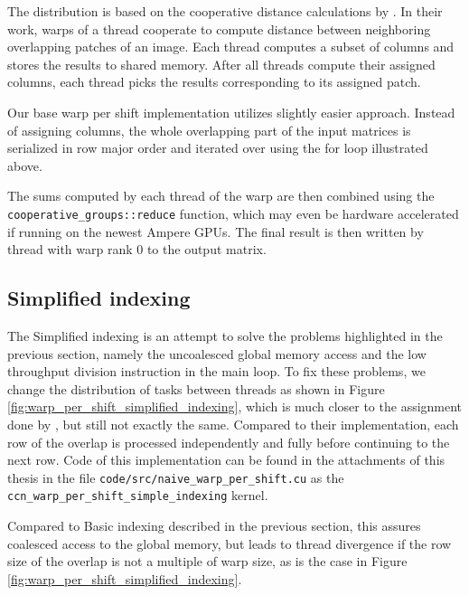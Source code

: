 The distribution is based on the cooperative distance calculations by \citet{paper:krulis_3d_block}. In their work, warps of a thread cooperate to compute distance between neighboring overlapping patches of an image. Each thread computes a subset of columns and stores the results to shared memory. After all threads compute their assigned columns, each thread picks the results corresponding to its assigned patch. 

Our base warp per shift implementation utilizes slightly easier approach. Instead of assigning columns, the whole overlapping part of the input matrices is serialized in row major order and iterated over using the for loop illustrated above. 

The sums computed by each thread of the warp are then combined using the \texttt{cooperative\_groups::reduce} function, which may even be hardware accelerated if running on the newest Ampere GPUs. The final result is then written by thread with warp rank $0$ to the output matrix. 


\subsection{Simplified indexing}

The Simplified indexing is an attempt to solve the problems highlighted in the previous section, namely the uncoalesced global memory access and the low throughput division instruction in the main loop. To fix these problems, we change the distribution of tasks between threads as shown in Figure \ref{fig:warp_per_shift_simplified_indexing}, which is much closer to the assignment done by \citet{paper:krulis_3d_block}, but still not exactly the same. Compared to their implementation, each row of the overlap is processed independently and fully before continuing to the next row. Code of this implementation can be found in the attachments of this thesis in the file \texttt{code/src/naive\_warp\_per\_shift.cu} as the \texttt{ccn\_warp\_per\_shift\_simple\_indexing} kernel.

Compared to Basic indexing described in the previous section, this assures coalesced access to the global memory, but leads to thread divergence if the row size of the overlap is not a multiple of warp size, as is the case in Figure \ref{fig:warp_per_shift_simplified_indexing}. 


